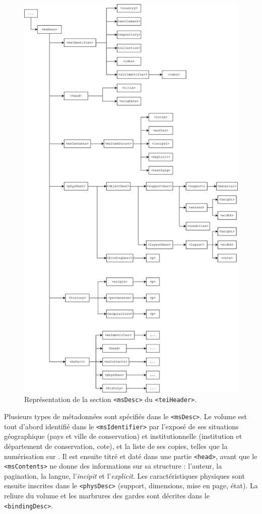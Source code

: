 \begin{figure}
    \centering
    \includegraphics[scale=0.625]{img/tree_msDesc.png}
    \caption{Représentation de la section \texttt{<msDesc>} du \texttt{<teiHeader>}.}
    \label{fig:tree_msDesc}
\end{figure}

Plusieurs types de métadonnées sont spécifiés dans le \texttt{<msDesc>}. Le volume est tout d'abord identifié dans le \texttt{<msIdentifier>} par l'exposé de ses situations géographique (pays et ville de conservation) et institutionnelle (institution et département de conservation, cote), et la liste de ses copies, telles que la numérisation sur \ia. Il est ensuite titré et daté dans une partie \texttt{<head>}, avant que le \texttt{<msContents>} ne donne des informations sur sa structure : l'auteur, la pagination, la langue, l'\textit{incipit} et l'\textit{explicit}. Les caractéristiques physiques sont ensuite inscrites dans le \texttt{<physDesc>} (support, dimensions, mise en page, état). La reliure du volume et les marbrures des gardes sont décrites dans le \texttt{<bindingDesc>}.

